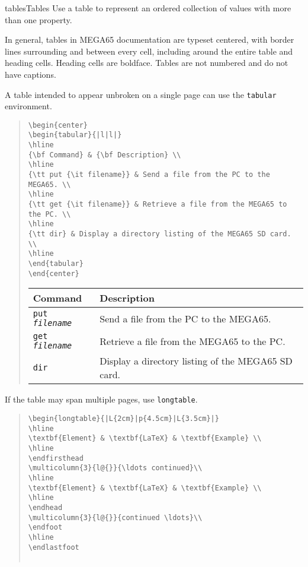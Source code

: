 \begin{sgentry}{tables}{Tables}
    Use a table to represent an ordered collection of values with more than one property.

    In general, tables in MEGA65 documentation are typeset centered, with border lines surrounding and between every cell, including around the entire table and heading cells. Heading cells are boldface. Tables are not numbered and do not have captions.

    A table intended to appear unbroken on a single page can use the \texttt{tabular} environment.

    \begin{quote}
\begin{verbatim}
\begin{center}
\begin{tabular}{|l|l|}
\hline
{\bf Command} & {\bf Description} \\
\hline
{\tt put {\it filename}} & Send a file from the PC to the MEGA65. \\
\hline
{\tt get {\it filename}} & Retrieve a file from the MEGA65 to the PC. \\
\hline
{\tt dir} & Display a directory listing of the MEGA65 SD card. \\
\hline
\end{tabular}
\end{center}
\end{verbatim}

\hrulefill

        \begin{center}
        \begin{tabular}{|l|l|}
        \hline
        {\bf Command} & {\bf Description} \\
        \hline
        {\tt put {\it filename}} & Send a file from the PC to the MEGA65. \\
        \hline
        {\tt get {\it filename}} & Retrieve a file from the MEGA65 to the PC. \\
        \hline
        {\tt dir} & Display a directory listing of the MEGA65 SD card. \\
        \hline
        \end{tabular}
        \end{center}
    \end{quote}

    If the table may span multiple pages, use \texttt{longtable}.

\begin{quote}
\begin{verbatim}
\begin{longtable}{|L{2cm}|p{4.5cm}|L{3.5cm}|}
\hline
\textbf{Element} & \textbf{LaTeX} & \textbf{Example} \\
\hline
\endfirsthead
\multicolumn{3}{l@{}}{\ldots continued}\\
\hline
\textbf{Element} & \textbf{LaTeX} & \textbf{Example} \\
\hline
\endhead
\multicolumn{3}{l@{}}{continued \ldots}\\
\endfoot
\hline
\endlastfoot


\end{verbatim}
\end{quote}
\end{sgentry}
